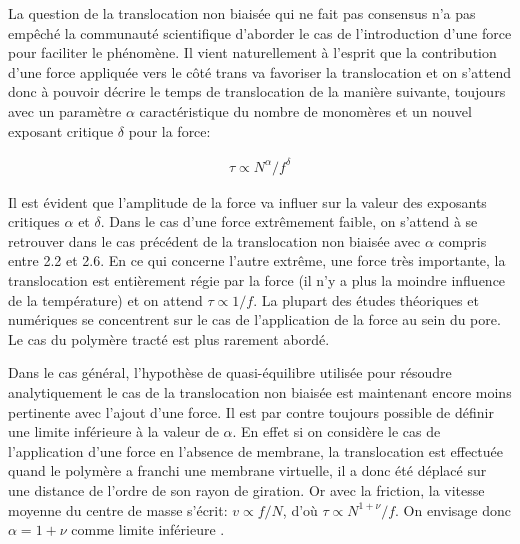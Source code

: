 La question de la translocation non biaisée qui ne fait pas consensus n'a pas empêché la communauté scientifique d'aborder le cas de l'introduction d'une force pour faciliter le phénomène. Il vient naturellement à l'esprit que la contribution d'une force appliquée vers le côté trans va favoriser la translocation et on s'attend donc à pouvoir décrire le temps de translocation de la manière suivante, toujours avec un paramètre $\alpha$ caractéristique du nombre de monomères et un nouvel exposant critique $\delta$ pour la force:

\begin{eqnarray}
\tau \propto N^\alpha / f^\delta
\label{taubiased}
\end{eqnarray}

Il est évident que l'amplitude de la force va influer sur la valeur des exposants critiques $\alpha$ et $\delta$. Dans le cas d'une force extrêmement faible, on s'attend à se retrouver dans le cas précédent de la translocation non biaisée avec $\alpha$ compris entre 2.2 et 2.6. En ce qui concerne l'autre extrême, une force très importante, la translocation est entièrement régie par la force (il n'y a plus la moindre influence de la température) et on attend $\tau \propto 1/f$.
 La plupart des études théoriques et numériques se concentrent sur le cas de l'application de la force au sein du pore. Le cas du polymère tracté est plus rarement abordé.
 
 Dans le cas général, l'hypothèse de quasi-équilibre utilisée pour résoudre analytiquement le cas de la translocation non biaisée est maintenant encore moins pertinente avec l'ajout d'une force. Il est par contre toujours possible de définir une limite inférieure à la valeur de $\alpha$. En effet si on considère le cas de l'application d'une force en l'absence de membrane, la translocation est effectuée quand le polymère a franchi une membrane virtuelle, il a donc été déplacé sur une distance de l'ordre de son rayon de giration. Or avec la friction, la vitesse moyenne du centre de masse s'écrit: $v \propto f/N$, d'où $\tau \propto N^{1+\nu}/f$. On envisage donc $\alpha=1+\nu$ comme limite inférieure \cite{Kantor2004}.
 
